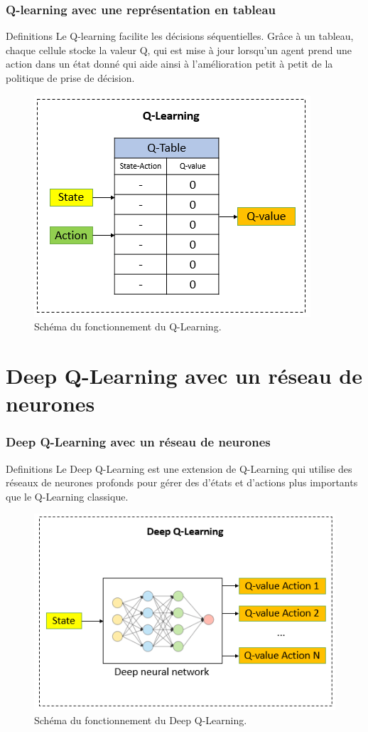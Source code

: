 \documentclass[
	11pt, %
]{beamer}
\begin{document}
\begin{frame}
	\frametitle{Q-learning avec une représentation en tableau}
	
	\begin{block}{Definitions}
		Le Q-learning facilite les décisions séquentielles. Grâce à un tableau, chaque cellule stocke la valeur Q, qui est mise à jour lorsqu'un agent prend une action dans un état donné qui aide ainsi à l'amélioration petit à petit de la politique de prise de décision.
	\end{block}
	
	\smallskip %

	\begin{figure}
		\includegraphics[width=0.4\linewidth]{Images/q_learning.png}
		\caption{Schéma du fonctionnement du Q-Learning.}
	\end{figure}

	
\end{frame}

\section{Deep Q-Learning avec un réseau de neurones}

\begin{frame}
	\frametitle{Deep Q-Learning avec un réseau de neurones}
	
	\begin{block}{Definitions}
		Le \alert{Deep Q-Learning} est une extension de Q-Learning qui utilise des réseaux de neurones profonds pour gérer des d'états et d'actions plus importants que le Q-Learning classique.
	\end{block}

	\smallskip %

	\begin{figure}
		\includegraphics[width=0.5\linewidth]{Images/deep_q_learning.png}
		\caption{Schéma du fonctionnement du Deep Q-Learning.}
	\end{figure}
	
\end{frame}
\end{document}
